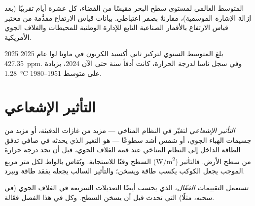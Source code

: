\begin{omfigure}

{\small المتوسط العالمي لمستوى سطح البحر مقيسًا من الفضاء، كل عشرة أيام تقريبًا
(بعد إزالة الإشارة الموسمية)، مقارنةً بصفر اعتباطي. بيانات قياس الارتفاع
مقدَّمة من مختبر قياس الارتفاع بالأقمار الصناعية التابع للإدارة الوطنية للمحيطات والغلاف الجوي الأمريكية.}
\end{omfigure}

\begin{dated}{2025}
بلغ المتوسط السنوي لتركيز ثاني أكسيد الكربون في ماونا لوا عام 2025
\qty{427.35}{ppm}. وفي سجل ناسا لدرجة الحرارة، كانت أدفأ سنة حتى الآن
2024، بزيادة \qty{1.28}{\degreeCelsius} على متوسط 1951--1980.
\end{dated}

\section{التأثير الإشعاعي}

\begin{definition}\label{def:g12:climate-change:forcing}
\emph{التأثير الإشعاعي} لتغيّر في
النظام المناخي --- مزيد من غازات الدفيئة، أو مزيد من جسيمات الهباء الجوي، أو شمس أشد سطوعًا ---
هو التغير الذي يحدثه في صافي تدفق الطاقة الداخل إلى
النظام المناخي عند قمة الغلاف الجوي، قبل أن تجد درجة حرارة السطح
وقتًا للاستجابة. ويُقاس بالواط لكل متر مربع
(\unit{W/m^2}) من سطح الأرض. فالتأثير الموجب يجعل الكوكب
يكسب طاقة ويسخن؛ والتأثير السالب يجعله يفقد طاقة ويبرد.
\end{definition}

\begin{remark}\label{rem:g12:climate-change:effective}
تستعمل التقييمات  \emph{الفعّال}، الذي يحسب أيضًا
التعديلات السريعة في الغلاف الجوي (في سحبه، مثلًا)
التي تحدث قبل أن يسخن السطح. وكل  في هذا الفصل
 فعّالة.
\end{remark}

